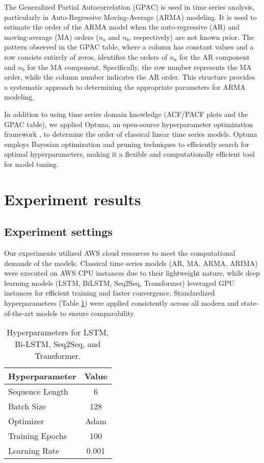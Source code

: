 \documentclass[sn-mathphys-num]{sn-jnl}
\theoremstyle{thmstyleone}%
\theoremstyle{thmstyletwo}%
\theoremstyle{thmstylethree}%
\begin{document}
The Generalized Partial Autocorrelation (GPAC) is used in time series analysis, particularly in Auto-Regressive Moving-Average (ARMA) modeling. It is used to estimate the order of the ARMA model when the auto-regressive (AR) and moving-average (MA) orders (\( n_a \) and \( n_b \), respectively) are not known prior. The pattern observed in the GPAC table, where a column has constant values and a row consists entirely of zeros, identifies the orders of \( n_a \) for the AR component and \( n_b \) for the MA component. Specifically, the row number represents the MA order, while the column number indicates the AR order. This structure provides a systematic approach to determining the appropriate parameters for ARMA modeling.


In addition to using time series domain knowledge (ACF/PACF plots and the GPAC table), we applied Optuna, an open-source hyperparameter optimization framework \cite{akiba2019optuna}, to determine the order of classical linear time series models. Optuna employs Bayesian optimization and pruning techniques to efficiently search for optimal hyperparameters, making it a flexible and computationally efficient tool for model tuning.

\section{Experiment results}

\subsection{Experiment settings}
Our experiments utilized AWS cloud resources to meet the computational demands of the models. Classical time series models (AR, MA, ARMA, ARIMA) were executed on AWS CPU instances due to their lightweight nature, while deep learning models (LSTM, BiLSTM, Seq2Seq, Transformer) leveraged GPU instances for efficient training and faster convergence. Standardized hyperparameters (Table \ref{tab:hyperparams}) were applied consistently across all modern and state-of-the-art models to ensure comparability.
\begin{table}[]
\centering
\begin{tabular}{lc}
\hline
\textbf{Hyperparameter} & \textbf{Value} \\ \hline
Sequence Length         & 6              \\ 
Batch Size              & 128            \\ 
Optimizer               & Adam           \\ 
Training Epochs         & 100            \\ 
Learning Rate           & 0.001          \\ \hline
\end{tabular}
\caption{Hyperparameters for LSTM, Bi-LSTM, Seq2Seq, and Transformer.}
\label{tab:hyperparams}
\end{table}
\end{document}
